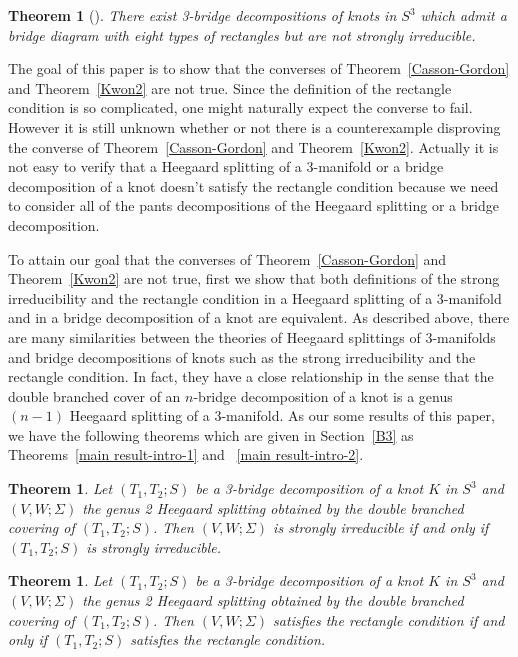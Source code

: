 \documentclass[12pt]{amsart}
\newtheorem{Thm}[theorem]{Theorem}
\begin{document}
\begin{Thm}[\cite{KL20}]\label{KL20}
There exist 3-bridge decompositions of knots in $S^3$ which admit a bridge diagram with eight types of rectangles but are not strongly irreducible.
\end{Thm}

The goal of this paper is to show that the converses of Theorem~\ref{Casson-Gordon} and Theorem~\ref{Kwon2} are not true.
Since the definition of the rectangle condition is so complicated, one might naturally expect the converse to fail.
However it is still unknown whether or not there is a counterexample disproving the converse of Theorem~\ref{Casson-Gordon} and Theorem~\ref{Kwon2}.
Actually it is not easy to verify that a Heegaard splitting of a 3-manifold or a bridge decomposition
of a knot doesn't satisfy the rectangle condition because we need to consider all of the pants decompositions of the Heegaard splitting or a bridge decomposition.

To attain our goal that the converses of Theorem~\ref{Casson-Gordon} and Theorem~\ref{Kwon2} are not true, first we show that both definitions of the strong irreducibility and the rectangle condition in a Heegaard splitting of a 3-manifold and in a bridge decomposition
of a knot are equivalent. As described above, there are many similarities between the theories of Heegaard splittings of 3-manifolds and bridge decompositions
of knots such as the strong irreducibility and the rectangle condition. In fact, they have a close relationship in the sense that the double branched cover of an $n$-bridge decomposition of a knot is
a genus $(n-1)$ Heegaard splitting of a 3-manifold. As our some results of this paper, we have the following theorems which are given in Section~\ref{B3} as Theorems~\ref{main result-intro-1} and ~\ref{main result-intro-2}.


\begin{Thm}\label{main result-2}
Let $(T_1, T_2; S)$ be a 3-bridge decomposition of a knot $K$ in $S^3$ and
$(V, W;\Sigma)$ the genus 2 Heegaard splitting obtained by the double branched covering of
$(T_1, T_2; S)$. Then $(V, W;\Sigma)$ is strongly irreducible if and only if $(T_1, T_2; S)$
is strongly irreducible.
\end{Thm}

\begin{Thm}\label{main result-1}
Let $(T_1, T_2; S)$ be a 3-bridge decomposition of a knot $K$ in $S^3$ and
$(V, W;\Sigma)$ the genus 2 Heegaard splitting obtained by the double branched covering of
$(T_1, T_2; S)$. Then $(V, W;\Sigma)$ satisfies the rectangle condition if and only if $(T_1, T_2; S)$ satisfies the rectangle condition.
\end{Thm}
\end{document}
